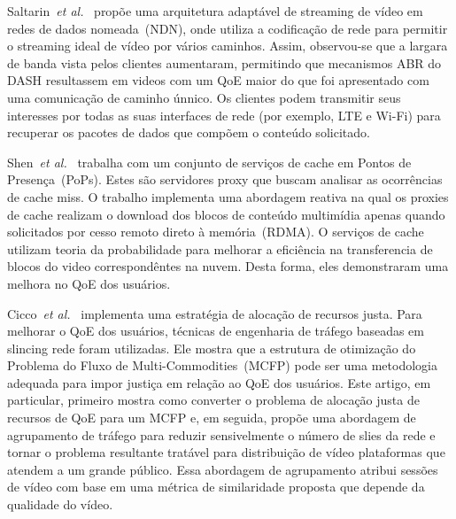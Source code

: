 Saltarin~\textit{et al.}~\cite{saltarinTrans2017} propõe uma arquitetura adaptável de streaming de vídeo em redes de dados nomeada~(NDN), onde utiliza a codificação de rede para permitir o streaming ideal de vídeo por vários caminhos. Assim, observou-se que a largara de banda vista pelos clientes aumentaram,
permitindo que mecanismos ABR do DASH resultassem em videos com um QoE maior do que foi apresentado com uma comunicação de caminho únnico.
Os clientes podem transmitir seus interesses por todas as suas interfaces de rede (por exemplo, LTE e Wi-Fi) para recuperar os pacotes de dados que compõem o conteúdo solicitado.

Shen~\textit{et al.}~\cite{shenIWQoS19} trabalha com um conjunto de serviços de cache em Pontos de Presença~(PoPs). Estes são servidores proxy que buscam analisar as ocorrências de cache miss.
O trabalho implementa uma abordagem reativa na qual os proxies de cache realizam o download dos blocos de conteúdo multimídia apenas quando solicitados por cesso remoto direto à memória~(RDMA). 
O serviços de cache utilizam teoria da probabilidade 
para melhorar a eficiência na transferencia de blocos do video correspondêntes na nuvem. Desta forma, eles demonstraram uma melhora no QoE dos usuários.

Cicco~\textit{et al.}~\cite{cicco:2019:QRA} implementa uma estratégia de alocação de recursos justa. Para melhorar o QoE dos usuários, técnicas de engenharia de tráfego baseadas em slincing rede foram utilizadas. Ele mostra que a estrutura de otimização do Problema do Fluxo de Multi-Commodities~(MCFP) pode ser uma metodologia adequada para impor justiça em relação ao QoE dos usuários. Este artigo, em particular, primeiro mostra como converter o problema de alocação justa de recursos de QoE para um MCFP e, em seguida, propõe uma abordagem de agrupamento de tráfego para reduzir sensivelmente o número de slies da rede e tornar o problema resultante tratável para distribuição de vídeo plataformas que atendem a um grande público. Essa abordagem de agrupamento atribui sessões de vídeo com base em uma métrica de similaridade proposta que depende da qualidade do vídeo.


